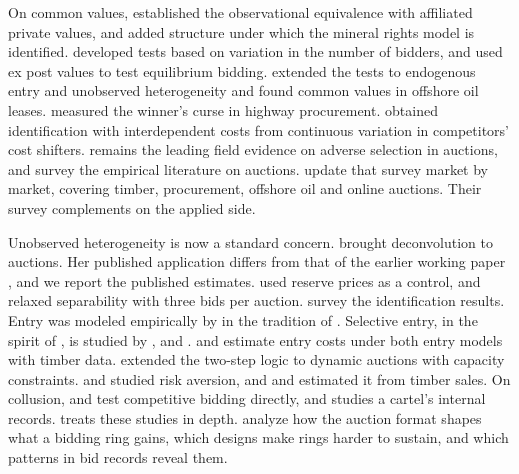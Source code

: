 On common values, \citet{LaffontVuong1996} established the observational equivalence with affiliated private
values, and \citet{LiPerrigneVuong2000} added structure under which the mineral rights model is identified.
\citet{HaileHongShum2003} developed tests based on variation in the number of bidders, and
\citet{HendricksPinksePorter2003} used ex post values to test equilibrium bidding.
\citet{CompianiHaileSantAnna2020} extended the tests to endogenous entry and unobserved heterogeneity and found
common values in offshore oil leases. \citet{HongShum2002} measured the winner's curse in highway
procurement. \citet{Somaini2020}
obtained identification with interdependent costs from continuous variation in competitors' cost shifters.
\citet{HendricksPorter1988} remains the leading field evidence on adverse selection in auctions, and
\citet{HendricksPorter2007} survey the empirical literature on auctions. \citet{HortacsuPerrigne2021} update
that survey market by market, covering timber, procurement, offshore oil and online auctions. Their survey
complements \citet{AtheyHaile2007} on the applied side.

Unobserved heterogeneity is now a standard concern. \citet{Krasnokutskaya2011} brought deconvolution to
auctions. Her published application differs from that of the earlier working paper \citep{Krasnokutskaya2004},
and we report the published estimates. \citet{Roberts2013} used reserve prices as a control, and
\citet{HuMcAdamsShum2013} relaxed separability with three bids per auction. \citet{HaileKitamura2019} survey
the identification results. Entry was modeled empirically by \citet{AtheyLevinSeira2011} in the tradition of
\citet{LevinSmith1994}. Selective entry, in the spirit of \citet{Samuelson1985}, is studied by
\citet{MarmerShneyerovXu2013}, \citet{GentryLi2014} and \citet{RobertsSweeting2013}. \citet{LiZheng2012} and
\citet{RobertsSweeting2016} estimate entry costs under both entry models with timber data.
\citet{JofreBonetPesendorfer2003} extended the two-step logic to dynamic auctions with capacity constraints.
\citet{CampoEtAl2011} and \citet{GuerrePerrigneVuong2009} studied risk aversion, and \citet{LuPerrigne2008}
and \citet{GrundlZhu2019} estimated it from timber sales. On collusion, \citet{PorterZona1993,PorterZona1999}
and \citet{BajariYe2003} test competitive bidding directly, and \citet{Asker2010} studies a cartel's internal
records.  treats these studies in depth. \citet{MarshallMarx2012} analyze how the
auction format shapes what a bidding ring gains, which designs make rings harder to sustain, and which
patterns in bid records reveal them.

